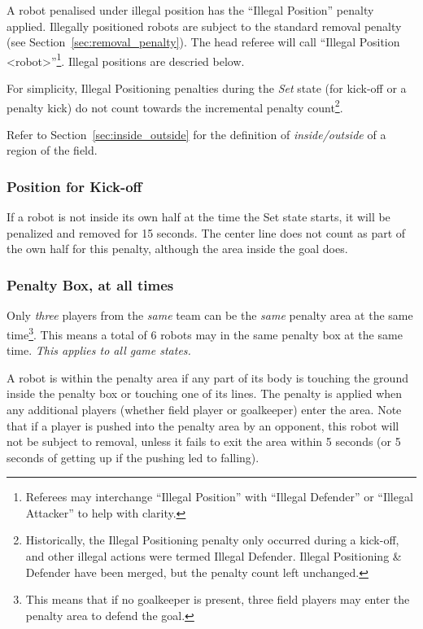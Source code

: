 \documentclass[12pt]{article}
\newcommand{\cf}{see\xspace}
\begin{document}
A robot penalised under illegal position has the ``Illegal Position'' penalty applied. Illegally positioned robots are subject to the standard removal penalty (\cf Section~\ref{sec:removal_penalty}).
The head referee will call ``Illegal Position  \textless robot\textgreater''\footnote{Referees may interchange ``Illegal Position'' with ``Illegal Defender'' or ``Illegal Attacker'' to help with clarity.}.
Illegal positions are descried below.

For simplicity, Illegal Positioning penalties during the \textit{Set} state (for kick-off or a penalty kick) do not count towards the incremental penalty count\footnote{Historically, the Illegal Positioning penalty only occurred during a kick-off, and other illegal actions were termed Illegal Defender. Illegal Positioning \& Defender have been merged, but the penalty count left unchanged.}.

Refer to Section~\ref{sec:inside_outside} for the definition of \textit{inside/outside} of a region of the field.

\subsubsection{Position for Kick-off}
If a robot is not inside its own half at the time the Set state starts, it will be penalized and removed for 15 seconds. The center line does not count as part of the own half for this penalty, although the area inside the goal does.

\subsubsection{Penalty Box, at all times}

Only \textit{three} players from the \textit{same} team can be the \textit{same} penalty area at the same time\footnote{This means that if no goalkeeper is present, three field players may enter the penalty area to defend the goal.}. This means a total of 6 robots may in the same penalty box at the same time.
\emph{This applies to all game states.}

A robot is within the penalty area if any part of its body is touching the ground inside the penalty box or touching one of its lines.  The penalty is applied when any additional players (whether field player or goalkeeper) enter the area. Note that if a player is pushed into the penalty area by an opponent, this robot will not be subject to removal, unless it fails to exit the area within 5 seconds (or 5 seconds of getting up if the pushing led to falling).
\end{document}
